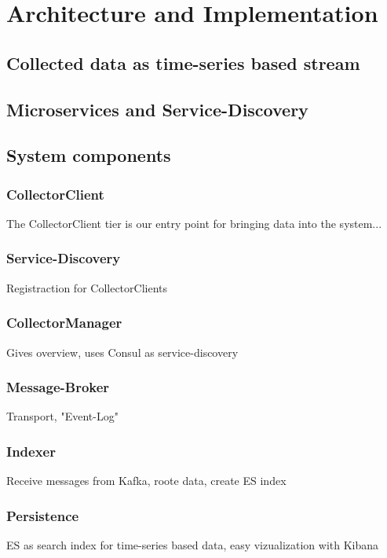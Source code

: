 \chapter{Architecture and Implementation}
\section{Collected data as time-series based stream}
\section{Microservices and Service-Discovery}
\section{System components}
\subsection{CollectorClient}
The CollectorClient tier is our entry point for bringing data into the system...
\subsection{Service-Discovery}
Registraction for CollectorClients
\subsection{CollectorManager}
Gives overview, uses Consul as service-discovery
\subsection{Message-Broker}
Transport, "Event-Log"
\subsection{Indexer}
Receive messages from Kafka, roote data, create ES index
\subsection{Persistence}
ES as search index for time-series based data, easy vizualization with Kibana

